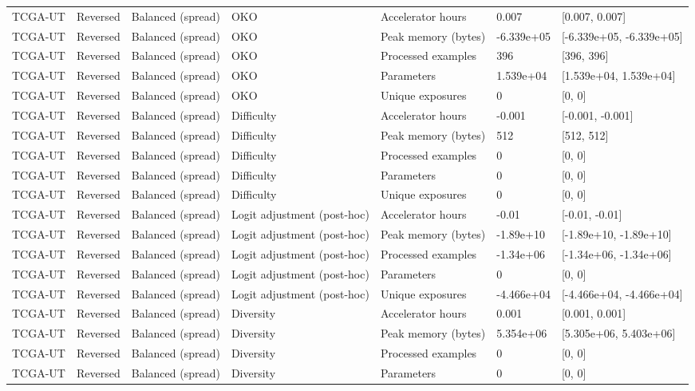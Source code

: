 \begin{longtable}{lllllll}
TCGA-UT & Reversed & Balanced (spread) & OKO & Accelerator hours & 0.007 & [0.007, 0.007] \\
TCGA-UT & Reversed & Balanced (spread) & OKO & Peak memory (bytes) & -6.339e+05 & [-6.339e+05, -6.339e+05] \\
TCGA-UT & Reversed & Balanced (spread) & OKO & Processed examples & 396 & [396, 396] \\
TCGA-UT & Reversed & Balanced (spread) & OKO & Parameters & 1.539e+04 & [1.539e+04, 1.539e+04] \\
TCGA-UT & Reversed & Balanced (spread) & OKO & Unique exposures & 0 & [0, 0] \\
TCGA-UT & Reversed & Balanced (spread) & Difficulty & Accelerator hours & -0.001 & [-0.001, -0.001] \\
TCGA-UT & Reversed & Balanced (spread) & Difficulty & Peak memory (bytes) & 512 & [512, 512] \\
TCGA-UT & Reversed & Balanced (spread) & Difficulty & Processed examples & 0 & [0, 0] \\
TCGA-UT & Reversed & Balanced (spread) & Difficulty & Parameters & 0 & [0, 0] \\
TCGA-UT & Reversed & Balanced (spread) & Difficulty & Unique exposures & 0 & [0, 0] \\
TCGA-UT & Reversed & Balanced (spread) & Logit adjustment (post-hoc) & Accelerator hours & -0.01 & [-0.01, -0.01] \\
TCGA-UT & Reversed & Balanced (spread) & Logit adjustment (post-hoc) & Peak memory (bytes) & -1.89e+10 & [-1.89e+10, -1.89e+10] \\
TCGA-UT & Reversed & Balanced (spread) & Logit adjustment (post-hoc) & Processed examples & -1.34e+06 & [-1.34e+06, -1.34e+06] \\
TCGA-UT & Reversed & Balanced (spread) & Logit adjustment (post-hoc) & Parameters & 0 & [0, 0] \\
TCGA-UT & Reversed & Balanced (spread) & Logit adjustment (post-hoc) & Unique exposures & -4.466e+04 & [-4.466e+04, -4.466e+04] \\
TCGA-UT & Reversed & Balanced (spread) & Diversity & Accelerator hours & 0.001 & [0.001, 0.001] \\
TCGA-UT & Reversed & Balanced (spread) & Diversity & Peak memory (bytes) & 5.354e+06 & [5.305e+06, 5.403e+06] \\
TCGA-UT & Reversed & Balanced (spread) & Diversity & Processed examples & 0 & [0, 0] \\
TCGA-UT & Reversed & Balanced (spread) & Diversity & Parameters & 0 & [0, 0] \\

\end{longtable}
